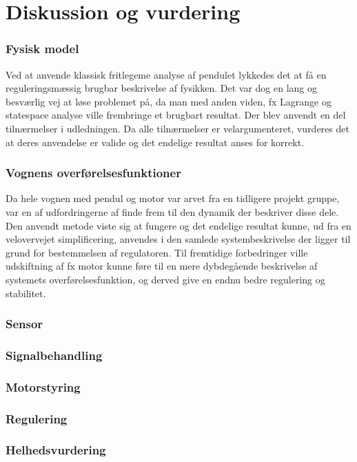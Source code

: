 \chapter{Diskussion og vurdering}\label{kap:diskussion}

\subsection{Fysisk model}
Ved at anvende klassisk fritlegeme analyse af pendulet lykkedes det at få en reguleringsmæssig brugbar beskrivelse af fysikken. 
Det var dog en lang og besværlig vej at løse problemet på, da man med anden viden, fx Lagrange og statespace analyse ville frembringe et brugbart resultat.
Der blev anvendt en del tilnærmelser i udledningen. 
Da alle tilnærmelser er velargumenteret, vurderes det at deres anvendelse er valide og det endelige resultat anses for korrekt.   

\subsection{Vognens overførelsesfunktioner}
Da hele vognen med pendul og motor var arvet fra en tidligere projekt gruppe, var en af udfordringerne af finde frem til den dynamik der beskriver disse dele.
Den anvendt metode viste sig at fungere og det endelige resultat kunne, ud fra en velovervejet simplificering, anvendes i den samlede systembeskrivelse der ligger til grund for bestemmelsen af regulatoren.
Til fremtidige forbedringer ville udskiftning af fx motor kunne føre til en mere dybdegående beskrivelse af systemets overførelsesfunktion, og derved give en endnu bedre regulering og stabilitet.

\subsection{Sensor}


\subsection{Signalbehandling}

\subsection{Motorstyring}


\subsection{Regulering}



\subsection{Helhedsvurdering}

